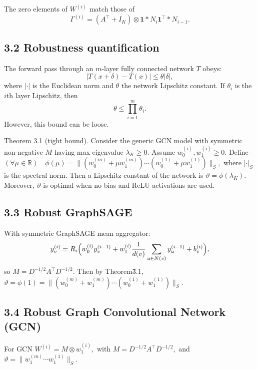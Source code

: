 \documentclass[11pt]{article}\usepackage{amsmath,amssymb,amsthm,bbm}
\newcommand{\1}{\mathbbm{1}}
\begin{document}
The zero elements of $W^{(i)}$ match those of
\begin{equation}
\Gamma^{(i)} = (A^\top + I_K)\otimes \mathbf{1}*{N_i}\mathbf{1}^\top*{N_{i-1}}.
\end{equation}

\subsection*{3.2 Robustness quantification}
The forward pass through an $m$-layer fully connected network $T$ obeys:
\begin{equation}
|T(x+\delta)-T(x)| \le \theta|\delta|,
\end{equation}
where $|\cdot|$ is the Euclidean norm and $\theta$ the network Lipschitz constant. If $\theta_i$ is the $i$th layer Lipschitz, then
\begin{equation}
\theta \le \prod_{i=1}^m \theta_i.
\end{equation}
However, this bound can be loose.

Theorem 3.1 (tight bound). Consider the generic GCN model with symmetric non-negative $M$ having max eigenvalue $\lambda_K\ge0$. Assume $w_0^{(i)},w_1^{(i)}\ge0$. Define
$(\forall\mu\in\mathbb{R})\quad \phi(\mu) = \| (w_0^{(m)}+\mu w_1^{(m)})\cdots(w_0^{(1)}+\mu w_1^{(1)}) \|_S,$
where $|\cdot|_S$ is the spectral norm. Then a Lipschitz constant of the network is
$\vartheta = \phi(\lambda_K).$
Moreover, $\vartheta$ is optimal when no bias and ReLU activations are used.

\subsection*{3.3 Robust GraphSAGE}
With symmetric GraphSAGE mean aggregator:
\begin{equation}
y_v^{(i)} = R_i\Bigl(w_0^{(i)}y_v^{(i-1)} + w_1^{(i)}\frac{1}{d(v)}\sum_{u\in N(v)} y_u^{(i-1)} + b_v^{(i)}\Bigr),
\end{equation}
so
$M = D^{-1/2}A^\top D^{-1/2}.$
Then by Theorem\~3.1,
$\vartheta = \phi(1) = \| (w_0^{(m)}+w_1^{(m)})\cdots(w_0^{(1)}+w_1^{(1)})\|_S.$

\subsection*{3.4 Robust Graph Convolutional Network (GCN)}
For GCN 
$W^{(i)} = M\otimes w_1^{(i)},$
with
$M = D^{-1/2}A^\top D^{-1/2},$
and
$\vartheta = \|w_1^{(m)}\cdots w_1^{(1)}\|_S.$
\end{document}
